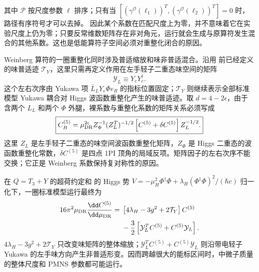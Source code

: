 其中 $\mathcal P$ 按尺度参数 $\ell$ 排序；只有当 $[(\gamma^{\mathcal O}(\ell_1))^T,(\gamma^{\mathcal O}(\ell_2))^T]=0$ 时，路径有序符号才可以去掉。
因此某个系数在匹配尺度上为零，并不意味着它在实验尺度上仍为零；只要反常维数矩阵存在非对角元，运行就会生成与原算符发生混合的其他系数。这也是低能算符子空间必须对重整化闭合的原因。

Weinberg 算符的一圈重整化同时涉及普适缩放和味非普适混合。沿用 前已经定义的味普适迹 $\mathcal T_Y$，这里只需再定义作用在左手轻子二重态味空间的矩阵
\begin{equation*}
 \mathcal Y_L\equiv Y_eY_e^\dagger.
\end{equation*}
这个左右次序由 Yukawa 项 $\bar L_LY_e\Phi e_R$ 的指标位置固定；$\mathcal T_Y$ 则继续表示全部标准模型 Yukawa 耦合对 Higgs 波函数重整化产生的味普适迹。取 $d=4-2\epsilon$，由于 含两个 $L_L$ 和两个 $\Phi$ 外腿，裸系数与重整化系数的矩阵关系必须写成
\begin{equation}
\boxed{
 C_B^{(5)}
 =\mu_{\rm DR}^{2\epsilon} Z_\Phi^{-1}
 (Z_L^T)^{-1/2}
 \left[C^{(5)}+\delta C^{(5)}\right]
 Z_L^{-1/2}.}
\label{eq:weinberg-bare-renorm-dp91}
\end{equation}
这里 $Z_L$ 是左手轻子二重态的味空间波函数重整化矩阵，$Z_\Phi$ 是 Higgs 二重态的波函数重整化常数，$\delta C^{(5)}$ 是四点 1PI 顶角的局域反项。矩阵因子的左右次序不能交换；它正是 Weinberg 系数保持复对称性的原因。

在 $Q=T_3+Y$ 的超荷约定和 的 Higgs 势
$V=-\mu_H^2\Phi^\dagger\Phi+\lambda_H(\Phi^\dagger\Phi)^2/(\hbar c)$ 归一化下，一圈标准模型运行最终为
\begin{align}
16\pi^2\mu_{\rm DR}\frac{\dd C^{(5)}}{\dd\mu_{\rm DR}}
={}&\left[4\lambda_H-3g^2+2\mathcal T_Y\right]C^{(5)}\nonumber\\
&-\frac32\left[\mathcal Y_L^T C^{(5)}+C^{(5)}\mathcal Y_L\right].
\label{eq:weinberg-matrix-rg-dp32}
\end{align}
$4\lambda_H-3g^2+2\mathcal T_Y$ 只改变味矩阵的整体缩放；$\mathcal Y_L^TC^{(5)}+C^{(5)}\mathcal Y_L$ 则沿带电轻子 Yukawa 的左手味方向产生非普适形变。因而跨越很大的能标区间时，中微子质量的整体尺度和 PMNS 参数都可能运行。

